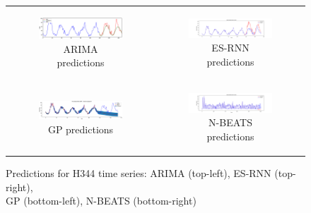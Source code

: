 \documentclass{article}
\begin{document}
\begin{figure}[!h]
  \centering
  \begin{tabular}[c]{cc}
    \begin{subfigure}[c]{0.6\textwidth}
      \includegraphics[width=\textwidth]{H344_ARIMA.eps}
      \caption{ARIMA predictions}
      \label{fig:H344stackpred1}
    \end{subfigure}&
    \begin{subfigure}[c]{0.6\textwidth}
      \includegraphics[width=\textwidth]{H344_esrnn_time_series.png}
      \caption{ES-RNN predictions}
      \label{fig:H344stackpred2}
    \end{subfigure}\\
    \begin{subfigure}[c]{0.5\textwidth}
      \includegraphics[width=\textwidth]{H344_GP_time_series.eps}
      \caption{GP predictions}
      \label{fig:H344stackpred3}
    \end{subfigure}&
    \begin{subfigure}[c]{0.6\textwidth}
      \includegraphics[width=\textwidth]{H344_nbeats_time_series.png}
      \caption{N-BEATS predictions}
      \label{fig:H344stackpred4}
    \end{subfigure}\\
  \end{tabular}    
  \caption{Predictions for H344 time series: ARIMA (top-left), ES-RNN (top-right), \\ GP (bottom-left), N-BEATS (bottom-right)}
  \label{fig:H344stackpred}
\end{figure}
\end{document}
